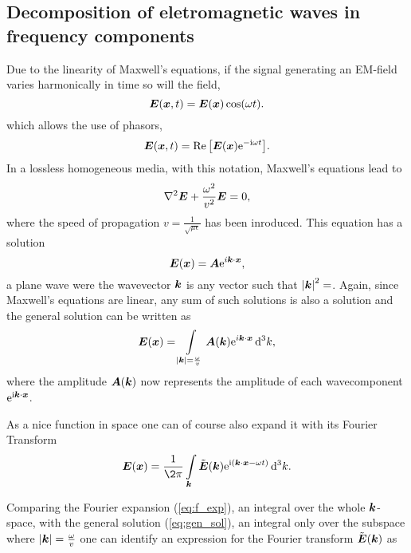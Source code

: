 \documentclass[11pt,a4paper, 
english, swedish %
]{article}
\begin{document}
\subsection{Decomposition of eletromagnetic waves in frequency components}

Due to the linearity of Maxwell's equations, if the signal generating an EM-field varies harmonically in time so will the field,
\begin{equation*}
\vb*E(\vb*x,t)=\vb*E(\vb*x)\cos(\omega t).
\end{equation*}
which allows the use of phasors,
\begin{equation*}
\vb*E(\vb*x,t)=\Re\qty[\vb*E(\vb*x)\mathrm{e}^{-\mathrm{i}\omega t}].
\end{equation*}
In a lossless homogeneous media, with this notation, Maxwell's equations lead to
\begin{equation}
  \label{eq:wave_free}
  \laplacian  \vb*E + \frac{\omega^2}{v^2}\vb*E=0,
\end{equation} 
where the speed of propagation $v=\frac{1}{\sqrt{\mu \epsilon}}$ has been inroduced. This equation has a solution
\begin{equation*}
\vb*E(\vb*x)=\vb*A\mathrm{e}^{i\vb*k \cdot \vb*x},
\end{equation*}
a plane wave were the wavevector $\vb*k$ is any vector such that $\abs{\vb*k}^2=$. Again, since Maxwell's equations are linear, any sum of such solutions is also a solution and the general solution can be written as
\begin{equation}
  \label{eq:gen_sol}
  \vb*E(\vb*x)=\int_{\abs{\vb*k}=\frac{\omega}{v}}\vb*A(\vb*k)\ee^{i\vb*k\cdot\vb*x}\id^3k,
\end{equation}
where the amplitude $\vb*A(\vb*k)$ now represents the amplitude of each wavecomponent $\mathrm{e}^{\mathrm{i}\vb*k \cdot \vb*x}$.

As a nice function in space one can of course also expand it with its Fourier Transform
\begin{equation}
  \label{eq:f_exp}
  \vb*E(\vb*x)=\frac{1}{\2\pi}\int_{\vb*k} \tilde{\vb*E}(\vb*k) \ee^{\ii(\vb*k\cdot\vb*x - \omega t)}\id^3k.
\end{equation}


Comparing the Fourier expansion (\ref{eq:f_exp}), an integral over the whole $\vb*k$-space, with the general solution (\ref{eq:gen_sol}), an integral only over the subspace where $\abs{\vb*k}=\frac{\omega}{v}$ one can identify an expression for the Fourier transform $\tilde{\vb*E}(\vb*k)$ as
\end{document}
